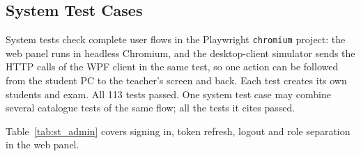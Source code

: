 \subsection{System Test Cases}\label{subsec:system_tests}

System tests check complete user flows in the Playwright \texttt{chromium} project: the web panel runs in headless Chromium, and the desktop-client simulator sends the HTTP calls of the WPF client in the same test, so one action can be followed from the student PC to the teacher's screen and back. Each test creates its own students and exam.
All 113 tests passed. One system test case may combine several catalogue tests of the same flow; all the tests it cites passed.

\enlargethispage{3\baselineskip}Table~\ref{tab:st_admin} covers signing in, token refresh, logout and role separation in the web panel.


